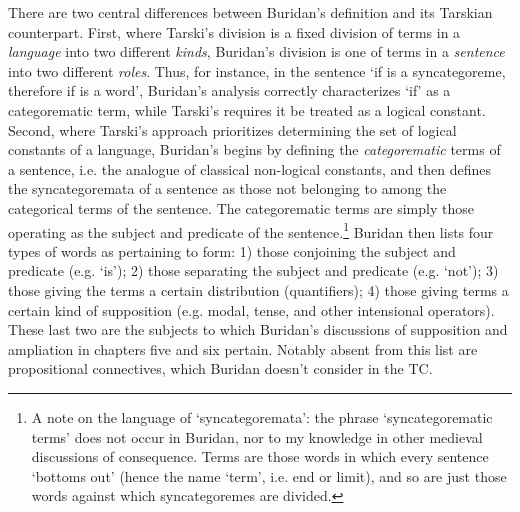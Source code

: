 \documentclass[]{article}
\begin{document}
There are two central differences between Buridan's definition and its Tarskian counterpart. First, where Tarski's division is a fixed division of terms in a \textit{language} into two different \textit{kinds}, Buridan's division is one of terms in a \textit{sentence} into two different \textit{roles}. Thus, for instance, in the sentence `if is a syncategoreme, therefore if is a word', Buridan's analysis correctly characterizes `if' as a categorematic term, while Tarski's requires it be treated as a logical constant. Second, where Tarski's approach prioritizes determining the set of logical constants of a language, Buridan's begins by defining the \textit{categorematic} terms of a sentence, i.e. the analogue of classical non-logical constants, and then defines the syncategoremata of a sentence as those not belonging to among the categorical terms of the sentence. The categorematic terms are simply those operating as the subject and predicate of the sentence.\footnote{A note on the language of `syncategoremata': the phrase `syncategorematic terms' does not occur in Buridan, nor to my knowledge in other medieval discussions of consequence. Terms are those words in which every sentence `bottoms out' (hence the name `term', i.e. end or limit), and so are just those words against which syncategoremes are divided.} Buridan then lists four types of words as pertaining to form: 1) those conjoining the subject and predicate (e.g. `is'); 2) those separating the subject and predicate (e.g. `not'); 3) those giving the terms a certain distribution (quantifiers); 4) those giving terms a certain kind of supposition (e.g. modal, tense, and other intensional operators). These last two are the subjects to which Buridan's discussions of supposition and ampliation in chapters five and six pertain. Notably absent from this list are propositional connectives, which Buridan doesn't consider in the TC.
\end{document}
